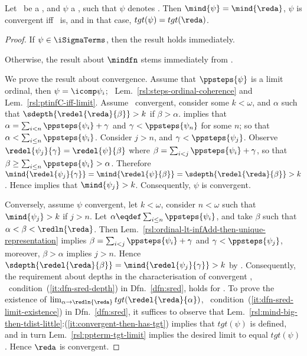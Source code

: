 \begin{lemma}
\label{rsl:redseq-denotation-implications}
Let \reda\ be a \redseq, and $\psi$ a \pnpterm, such that $\psi$ denotes \reda.
Then $\mind{\psi} = \mind{\reda}$, $\psi$ is convergent iff \reda\ is, and in that case, $tgt(\psi) = tgt(\reda)$.
\end{lemma}

\begin{proof}
If $\psi \in \iSigmaTerms$, then the result holds immediately.

Otherwise, the result about $\mindfn$ stems immediately from .

We prove the result about convergence.
Assume that $\ppsteps{\psi}$ is a limit ordinal, then $\psi = \icomp \psi_i$; \confer\ Lem.~\ref{rsl:steps-ordinal-coherence} and Lem.~\ref{rsl:ptinfC-iff-limit}.
Assume \reda\ convergent, consider some $k < \omega$, and $\alpha$ such that $\sdepth{\redel{\reda}{\beta}} > k$ if $\beta > \alpha$.
 implies that $\alpha = \sum_{i < n} \ppsteps{\psi_i} + \gamma$ and $\gamma < \ppsteps{\psi_n}$ for some $n$; so that $\alpha < \sum_{i \leq n} \ppsteps{\psi_i}$.
Consider $j > n$, and $\gamma < \ppsteps{\psi_j}$. Observe $\redel{\psi_j}{\gamma} = \redel{\psi}{\beta}$ where $\beta = \sum_{i < j} \ppsteps{\psi_i} + \gamma$, so that $\beta \geq \sum_{i \leq n} \ppsteps{\psi_i} > \alpha$. Therefore $\mind{\redel{\psi_j}{\gamma}} = \mind{\redel{\psi}{\beta}} = \sdepth{\redel{\reda}{\beta}} > k$.
Hence  implies that $\mind{\psi_j} > k$. Consequently, $\psi$ is convergent.

Conversely, assume $\psi$ convergent, let $k < \omega$, consider $n < \omega$ such that $\mind{\psi_j} > k$ if $j > n$. 
Let $\alpha \eqdef \sum_{i \leq n} \ppsteps{\psi_i}$, and take $\beta$ such that $ \alpha < \beta < \redln{\reda}$. 
Then Lem.~\ref{rsl:ordinal-lt-infAdd-then-unique-representation} implies $\beta = \sum_{i < j} \ppsteps{\psi_i} + \gamma$ and $\gamma < \ppsteps{\psi_j}$, moreover, $\beta > \alpha$ implies $j > n$.
Hence $\sdepth{\redel{\reda}{\beta}} = \mind{\redel{\psi_j}{\gamma}} > k$ by . Consequently, the requirement about depths in the characterisation of convergent \redseqs, \ie\ condition~(\ref{it:dfn-sred-depth}) in Dfn.~\ref{dfn:sred}, holds for \reda.
To prove the existence of $\lim_{\alpha \to \redln{\reda}} tgt(\redel{\reda}{\alpha})$, \ie\ condition~(\ref{it:dfn-sred-limit-existence}) in Dfn.~\ref{dfn:sred}, it suffices to observe that Lem.~\ref{rsl:mind-big-then-tdist-little}:(\ref{it:convergent-then-has-tgt}) implies that $tgt(\psi)$ is defined, and in turn Lem.~\ref{rsl:ppterm-tgt-limit} implies the desired limit to equal $tgt(\psi)$. Hence $\reda$ is convergent.


\end{proof}
